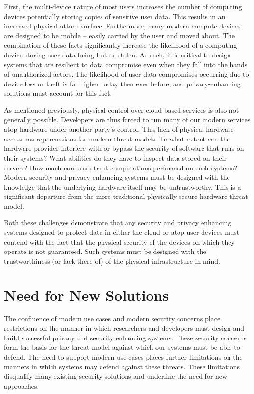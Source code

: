 First, the multi-device nature of most users increases the number of
computing devices potentially storing copies of sensitive user
data. This results in an increased physical attack surface.
Furthermore, many modern compute devices are designed to be mobile --
easily carried by the user and moved about. The combination of these
facts significantly increase the likelihood of a computing device
storing user data being lost or stolen. As such, it is critical to
design systems that are resilient to data compromise even when they
fall into the hands of unauthorized actors. The likelihood of user
data compromises occurring due to device loss or theft is far higher
today then ever before, and privacy-enhancing solutions must account
for this fact.

As mentioned previously, physical control over cloud-based services is
also not generally possible. Developers are thus forced to run many of
our modern services atop hardware under another party's control. This
lack of physical hardware access has repercussions for modern threat
models. To what extent can the hardware provider interfere with or
bypass the security of software that runs on their systems? What
abilities do they have to inspect data stored on their servers? How
much can users trust computations performed on such systems?  Modern
security and privacy enhancing systems must be designed with the
knowledge that the underlying hardware itself may be
untrustworthy. This is a significant departure from the more
traditional physically-secure-hardware threat model.

Both these challenges demonstrate that any security and privacy
enhancing systems designed to protect data in either the cloud or atop
user devices must contend with the fact that the physical security of
the devices on which they operate is not guaranteed. Such systems must
be designed with the trustworthiness (or lack there of) of the
physical infrastructure in mind.

\section{Need for New Solutions}
\label{chap:challenges:solutions}

The confluence of modern use cases and modern security concerns place
restrictions on the manner in which researchers and developers must
design and build successful privacy and security enhancing
systems. These security concerns form the basis for the threat model
against which our systems must be able to defend. The need to support
modern use cases places further limitations on the manners in which
systems may defend against these threats. These limitations disqualify
many existing security solutions and underline the need for new
approaches.

